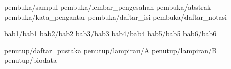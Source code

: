 \documentclass[a5paper, twoside, 11pt, listof=nochaptergap, bahasa] {book}
\begin{document}
\begin{sloppypar}
	
	\pagestyle {normal}
	
	\frontmatter
		 {pembuka/sampul}
		 {pembuka/lembar_pengesahan}
		 {pembuka/abstrak}
		 {pembuka/kata_pengantar}
		 {pembuka/daftar_isi}
		 {pembuka/daftar_notasi}
	
	\mainmatter
		 {bab1/bab1} \cleardoublepage
		 {bab2/bab2} \cleardoublepage
		 {bab3/bab3} \cleardoublepage
		 {bab4/bab4} \cleardoublepage
		 {bab5/bab5} \cleardoublepage
	 	 {bab6/bab6} \cleardoublepage
	
	\backmatter
	 	 {penutup/daftar_pustaka}
		 {penutup/lampiran/A}
		 {penutup/lampiran/B}
		 {penutup/biodata}
		
\end{sloppypar}
\end{document}
